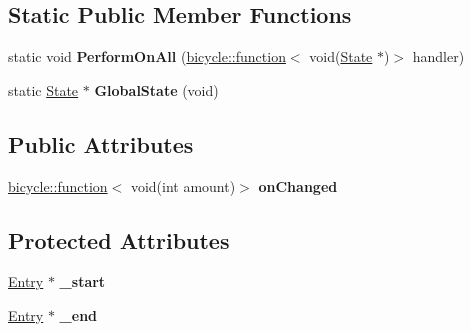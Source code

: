 \subsection*{Static Public Member Functions}
\begin{DoxyCompactItemize}
\item 
\mbox{\label{class_i_p_c___manager___internal_1_1_state_a050ee95e5a57695cc5ba191dd8595a72}} 
static void {\bfseries Perform\+On\+All} (\hyperlink{classbicycle_1_1function}{bicycle\+::function}$<$ void(\hyperlink{class_i_p_c___manager___internal_1_1_state}{State} $\ast$)$>$ handler)
\item 
\mbox{\label{class_i_p_c___manager___internal_1_1_state_a61d25e39c17dba33f6bae8dec7dc552b}} 
static \hyperlink{class_i_p_c___manager___internal_1_1_state}{State} $\ast$ {\bfseries Global\+State} (void)
\end{DoxyCompactItemize}
\subsection*{Public Attributes}
\begin{DoxyCompactItemize}
\item 
\mbox{\label{class_i_p_c___manager___internal_1_1_state_a9fc4eb71a03b4deb49b4a1c5d9390509}} 
\hyperlink{classbicycle_1_1function}{bicycle\+::function}$<$ void(int amount)$>$ {\bfseries on\+Changed}
\end{DoxyCompactItemize}
\subsection*{Protected Attributes}
\begin{DoxyCompactItemize}
\item 
\mbox{\label{class_i_p_c___manager___internal_1_1_state_adf72c8bead8ae53ddf9696645ae2e587}} 
\hyperlink{class_i_p_c___manager___internal_1_1_entry}{Entry} $\ast$ {\bfseries \+\_\+start}
\item 
\mbox{\label{class_i_p_c___manager___internal_1_1_state_add370f42ce24ad57a92e9d741a052dde}} 
\hyperlink{class_i_p_c___manager___internal_1_1_entry}{Entry} $\ast$ {\bfseries \+\_\+end}
\end{DoxyCompactItemize}

